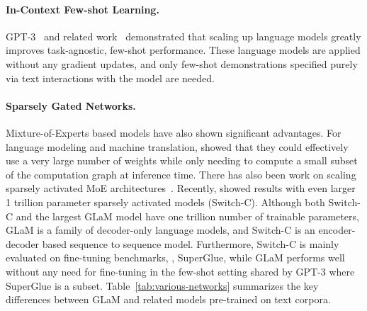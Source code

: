 \documentclass{article}
\newcommand{\glam}{GLaM\xspace}
\begin{document}
\paragraph{In-Context Few-shot Learning.} GPT-3~\cite{NEURIPS2020_gpt3} and related work~\cite{shoeybi2019megatron,lieber2021jurassic,wei2021finetuned} demonstrated that scaling up language models greatly improves task-agnostic, few-shot performance. These language models  are applied without any gradient updates, and only few-shot demonstrations specified purely via text interactions with the model are needed. 


\paragraph{Sparsely Gated Networks.}
Mixture-of-Experts based models have also shown significant advantages. For language modeling and machine translation, \citet{shazeer2017outrageously} showed that they could effectively use a very large number of weights while only needing to compute a small subset of the computation graph at inference time. There has also been work on scaling sparsely activated MoE architectures~\cite{hestness2017deep,shazeer2018mesh,lepikhin2020gshard, kudugunta2021beyond}. Recently, \citet{fedus2021switch} showed results with even larger 1 trillion parameter sparsely activated models (Switch-C). Although both  Switch-C and the largest \glam model have one trillion number of trainable parameters, \glam is a family of decoder-only language models, and Switch-C is an encoder-decoder based sequence to sequence model. Furthermore, 
Switch-C is mainly evaluated on fine-tuning benchmarks, \eg, SuperGlue, while \glam performs well without any need for fine-tuning in the few-shot setting shared by GPT-3 where SuperGlue is a subset.
Table~\ref{tab:various-networks} summarizes the key differences between GLaM and related models pre-trained on text corpora. 
\end{document}
